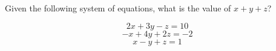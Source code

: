 Given the following system of equations, what is the value of $x + y + z$?

\[2x + 3y - z = 10\]\[-x + 4y + 2z = -2\]\[x - y + z = 1\]
